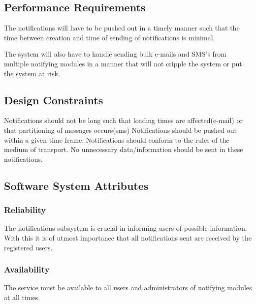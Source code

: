 \documentclass{article}
\begin{document}
	\subsection{Performance Requirements}
    \begin{flushleft}
    The notifications will have to be pushed out in a timely manner such that the time between creation and time of sending of notifications is minimal.
    \newline
    
    The system will also have to handle sending bulk e-mails and SMS's from multiple notifying modules in a manner that will not cripple the system or put the system at risk.
    \end{flushleft}
    
    \subsection{Design Constraints}
    \begin{flushleft}
    Notifications should not be long such that loading times are affected(e-mail) or that partitioning of messages occurs(sms)
    \newline
    Notifications should be pushed out within a given time frame.
    \newline
    Notifications should conform to the rules of the medium of transport.
    \newline
    No unnecessary data/information should be sent in these notifications. 
    \end{flushleft}
    
    \subsection{Software System Attributes}
	\subsubsection{Reliability}    
    \begin{flushleft}
    The notifications subsystem is crucial in informing users of possible information. With this it is of utmost importance that all notifications sent are received by the registered users.
    \end{flushleft}
    
    	\subsubsection{Availability}    
    \begin{flushleft}
The service must be available to all users and administrators of notifying modules at all times.
    \end{flushleft}
    
\end{document}
